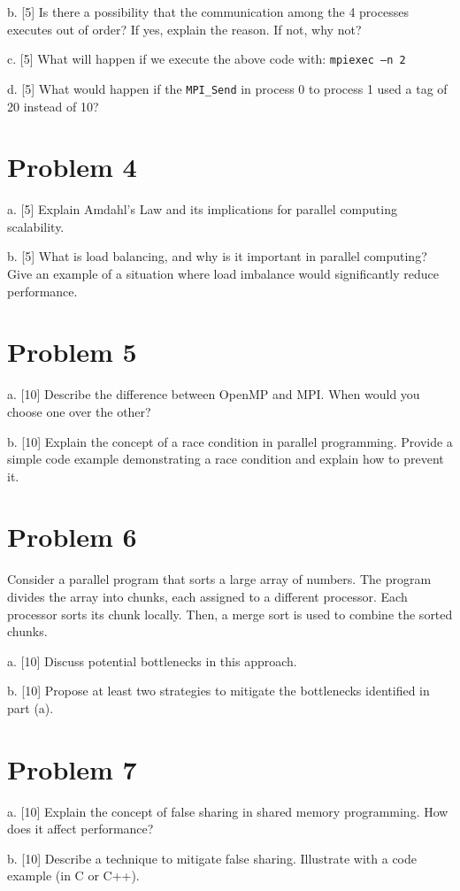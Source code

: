 \documentclass{article}
\begin{document}
b. [5] Is there a possibility that the communication among the 4 processes executes out of order? If yes, explain the reason. If not, why not?

c. [5] What will happen if we execute the above code with: \texttt{mpiexec –n 2}

d. [5]  What would happen if the \texttt{MPI_Send} in process 0 to process 1 used a tag of 20 instead of 10?


\section*{Problem 4}
a. [5] Explain Amdahl's Law and its implications for parallel computing scalability.

b. [5] What is load balancing, and why is it important in parallel computing? Give an example of a situation where load imbalance would significantly reduce performance.

\section*{Problem 5}
a. [10] Describe the difference between OpenMP and MPI.  When would you choose one over the other?

b. [10] Explain the concept of a race condition in parallel programming. Provide a simple code example demonstrating a race condition and explain how to prevent it.


\section*{Problem 6}
Consider a parallel program that sorts a large array of numbers.  The program divides the array into chunks, each assigned to a different processor. Each processor sorts its chunk locally.  Then, a merge sort is used to combine the sorted chunks.

a. [10]  Discuss potential bottlenecks in this approach.

b. [10]  Propose at least two strategies to mitigate the bottlenecks identified in part (a).


\section*{Problem 7}
a. [10] Explain the concept of false sharing in shared memory programming.  How does it affect performance?

b. [10] Describe a technique to mitigate false sharing.  Illustrate with a code example (in C or C++).
\end{document}
